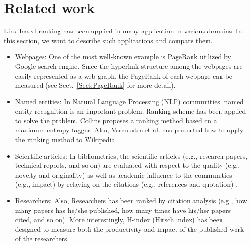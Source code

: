 \documentclass[lnicst]{svmultln}
\begin{document}
\begin{itemize}






\end{itemize}

\section{Related work}\label{Sect:Related}
Link-based ranking has been applied in many application in various domains.
In this section, we want to describe such applications and compare them. 
\begin{itemize}
\item Webpages:
One of the most well-known example is PageRank utilized by Google search engine. 
Since the hyperlink structure among the webpages are easily represented as a web graph, 
the PageRank of each webpage can be measured (see Sect.~\ref{Sect:PageRank} for more detail).

\item Named entities:
In Natural Language Processing (NLP) communities, named entity recognition is an important problem. 
Ranking scheme has been applied to solve the problem. Collins \cite{Collins-ACL-02} proposes a ranking method based on a maximum-entropy tagger. Also, 
Vercoustre et al. \cite{Vercoustre-SAC-08} has presented how to apply the ranking method to Wikipedia. 

\item Scientific articles:
In bibliometrics, the scientific articles (e.g., research papers, technical reports, and so on) are evaluated with respect to the quality (e.g., novelty and originality) as well as academic influence to the communities (e.g., impact) by relaying on the citations (e.g., references and quotation) \cite{Cronin-JIS-01}.

\item Researchers:
Also, Researchers has been ranked by citation analysis (e.g., how many papers has he/she published, how many times have his/her papers cited, and so on). More interestingly, H-index (Hirsch index) has been designed to 
measure both the productivity and impact of the published work of the researchers. 

\end{itemize}
\end{document}
